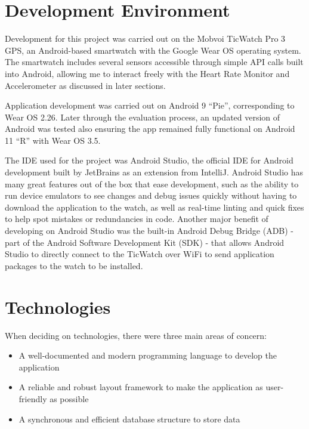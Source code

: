 \documentclass{l4proj}
\begin{document}
\section{Development Environment}
\label{sec:devenv}

Development for this project was carried out on the Mobvoi TicWatch Pro 3 GPS, an Android-based smartwatch with the Google Wear OS operating system. The smartwatch includes several sensors accessible through simple API calls built into Android, allowing me to interact freely with the Heart Rate Monitor and Accelerometer as discussed in later sections. 

Application development was carried out on Android 9 “Pie”, corresponding to Wear OS 2.26. Later through the evaluation process, an updated version of Android was tested also ensuring the app remained fully functional on Android 11 “R” with Wear OS 3.5.

The IDE used for the project was Android Studio, the official IDE for Android development built by JetBrains as an extension from IntelliJ. Android Studio has many great features out of the box that ease development, such as the ability to run device emulators to see changes and debug issues quickly without having to download the application to the watch, as well as real-time linting and quick fixes to help spot mistakes or redundancies in code. Another major benefit of developing on Android Studio was the built-in Android Debug Bridge (ADB) - part of the Android Software Development Kit (SDK) - that allows Android Studio to directly connect to the TicWatch over WiFi to send application packages to the watch to be installed.

\section{Technologies}
\label{sec:technologies}

When deciding on technologies, there were three main areas of concern:

\begin{itemize}
    \item A well-documented and modern programming language to develop the application
    \item A reliable and robust layout framework to make the application as user-friendly as possible
    \item A synchronous and efficient database structure to store data
\end{itemize}
\end{document}
